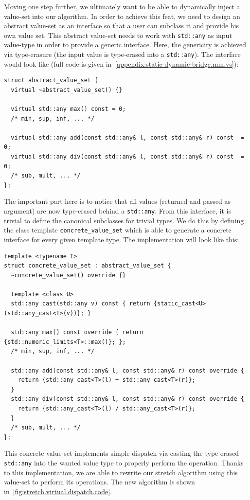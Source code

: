 Moving one step further, we ultimately want to be able to dynamically inject a value-set into our algorithm. In order to
achieve this feat, we need to design an abstract value-set as an interface so that a user can subclass it and provide
his own value set. This abstract value-set needs to work with \texttt{std::any} as input value-type in order to provide
a generic interface. Here, the genericity is achieved via type-erasure (the input value is type-erased into a
\texttt{std::any}). The interface would look like (full code is given in~\cref{appendix:static-dynamic-bridge.mm.vs}):
\begin{verbatim}
struct abstract_value_set {
  virtual ~abstract_value_set() {}

  virtual std::any max() const = 0;
  /* min, sup, inf, ... */

  virtual std::any add(const std::any& l, const std::any& r) const  = 0;
  virtual std::any div(const std::any& l, const std::any& r) const  = 0;
  /* sub, mult, ... */
};
\end{verbatim}
The important part here is to notice that all values (returned and passed as argument) are now type-erased behind a
\texttt{std::any}. From this interface, it is trivial to define the canonical subclasses for trivial types. We do this
by defining the class template \texttt{concrete\_value\_set} which is able to generate a concrete interface for every
given template type. The implementation will look like this:
\begin{verbatim}
template <typename T>
struct concrete_value_set : abstract_value_set {
  ~concrete_value_set() override {}

  template <class U>
  std::any cast(std::any v) const { return {static_cast<U>(std::any_cast<T>(v))}; }

  std::any max() const override { return {std::numeric_limits<T>::max()}; };
  /* min, sup, inf, ... */

  std::any add(const std::any& l, const std::any& r) const override {
    return {std::any_cast<T>(l) + std::any_cast<T>(r)};
  }
  std::any div(const std::any& l, const std::any& r) const override {
    return {std::any_cast<T>(l) / std::any_cast<T>(r)};
  }
  /* sub, mult, ... */
};
\end{verbatim}
This concrete value-set implements simple dispatch via casting the type-erased \texttt{std::any} into the wanted value
type to properly perform the operation. Thanks to this implementation, we are able to rewrite our stretch algorithm
using this value-set to perform its operations. The new algorithm is shown in~\cref{fig:stretch.virtual.dispatch.code}.

